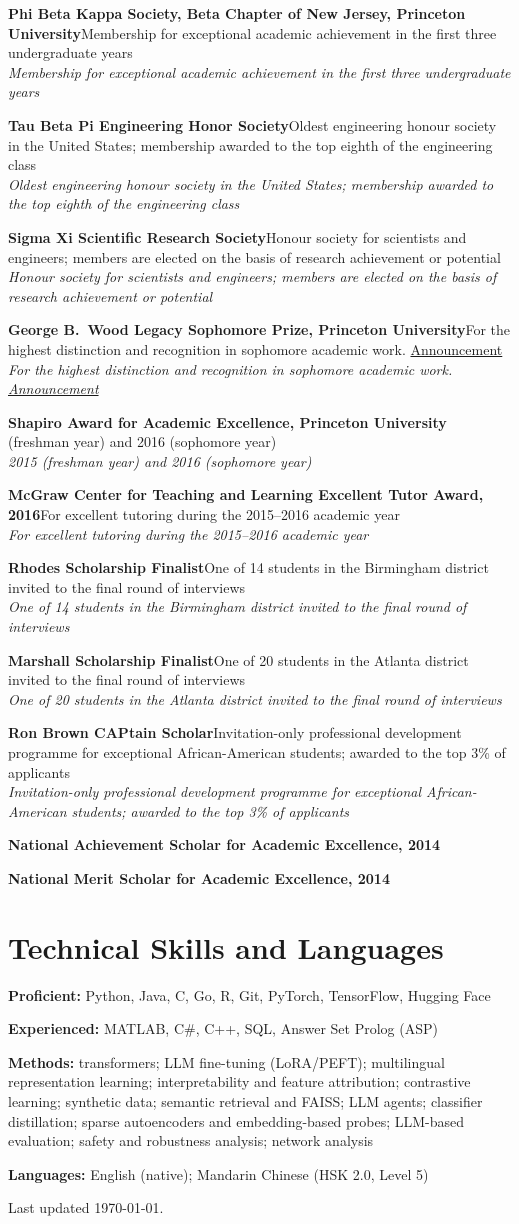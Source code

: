 \documentclass[11pt,letterpaper]{article}
\newcommand{\honor}[2]{%
  \Needspace{3\baselineskip}%
  \item \textbf{#1}\ifx\relax#2\relax\else\\{\small\itshape\color{inksoft}#2}\fi
}
\begin{document}
\begin{plain}
\honor{Phi Beta Kappa Society, Beta Chapter of New Jersey, Princeton University}{Membership for exceptional academic achievement in the first three undergraduate years}
\honor{Tau Beta Pi Engineering Honor Society}{Oldest engineering honour society in the United States; membership awarded to the top eighth of the engineering class}
\honor{Sigma Xi Scientific Research Society}{Honour society for scientists and engineers; members are elected on the basis of research achievement or potential}
\honor{George B.~Wood Legacy Sophomore Prize, Princeton University}{For the highest distinction and recognition in sophomore academic work. \href{https://www.princeton.edu/news/2016/09/11/princeton-students-honored-opening-exercises}{Announcement}}
\honor{Shapiro Award for Academic Excellence, Princeton University}{2015 (freshman year) and 2016 (sophomore year)}
\honor{McGraw Center for Teaching and Learning Excellent Tutor Award, 2016}{For excellent tutoring during the 2015--2016 academic year}
\honor{Rhodes Scholarship Finalist}{One of 14 students in the Birmingham district invited to the final round of interviews}
\honor{Marshall Scholarship Finalist}{One of 20 students in the Atlanta district invited to the final round of interviews}
\honor{Ron Brown CAPtain Scholar}{Invitation-only professional development programme for exceptional African-American students; awarded to the top 3\% of applicants}
\honor{National Achievement Scholar for Academic Excellence, 2014}{\relax}
\honor{National Merit Scholar for Academic Excellence, 2014}{\relax}
\end{plain}

\section{Technical Skills and Languages}

\begin{tight}
  \item \textbf{Proficient:} Python, Java, C, Go, R, Git, PyTorch, TensorFlow, Hugging Face
  \item \textbf{Experienced:} MATLAB, C\#, C++, SQL, Answer Set Prolog (ASP)
  \item \textbf{Methods:} transformers; LLM fine-tuning (LoRA/PEFT); multilingual representation learning;
        interpretability and feature attribution; contrastive learning; synthetic data;
        semantic retrieval and FAISS; LLM agents; classifier distillation;
        sparse autoencoders and embedding-based probes; LLM-based evaluation;
        safety and robustness analysis; network analysis
  \item \textbf{Languages:} English (native); Mandarin Chinese (HSK 2.0, Level 5)
\end{tight}

\vfill
{\scriptsize\color{inksoft}Last updated \today.}
\end{document}
